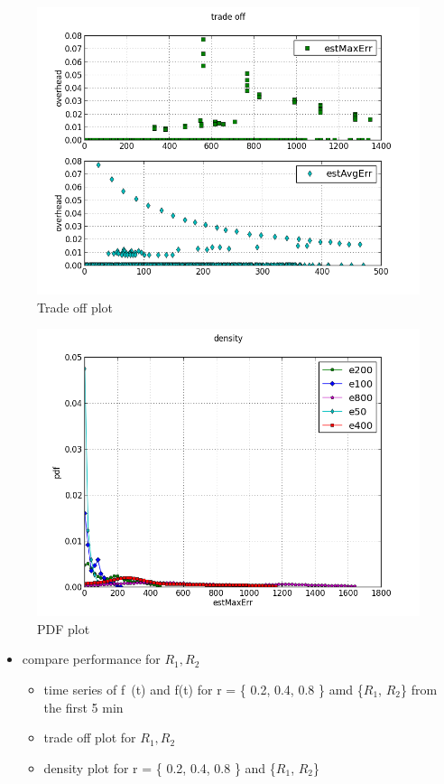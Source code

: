 \documentclass[a4paper, smallheadings,english]{scrartcl}
\begin{document}
\begin{figure}[h!]
    \begin{center}
        \includegraphics[scale=0.7]{plots/trade_off}
    \end{center}
    \caption{Trade off plot}
    \label{fig:to}
\end{figure}
\begin{figure}[h!]
    \begin{center}
        \includegraphics[scale=0.7]{plots/pdf_of_error}
    \end{center}
    \caption{PDF plot}
    \label{fig:pdf}
\end{figure}

\begin{itemize}
    \item compare performance for $R_1, R_2$
    \begin{itemize}
        \item time series of f~(t) and f(t) for r = \{ 0.2, 0.4, 0.8 \} amd \{$R_1$, $R_2$\} from the first 5 min
        \item trade off plot for $R_1, R_2$
        \item density plot for r = \{ 0.2, 0.4, 0.8 \} and \{$R_1$, $R_2$\}
    \end{itemize}
\end{itemize}
\end{document}

